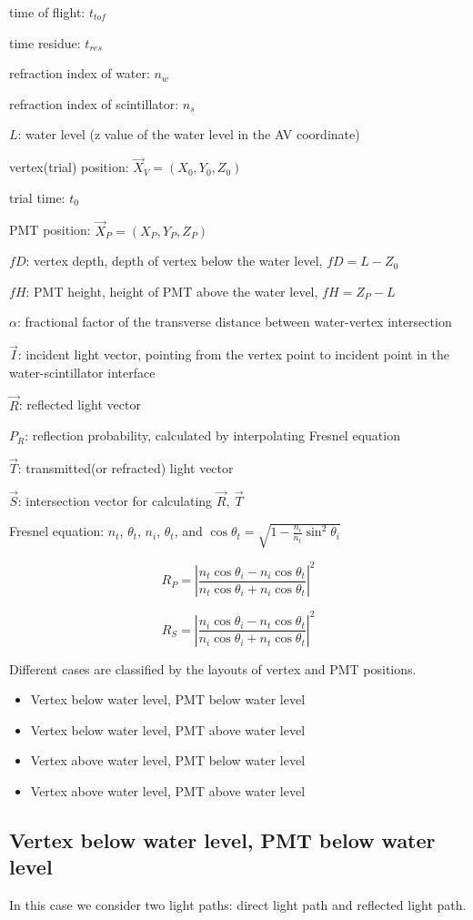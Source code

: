 \documentclass[preprint,12pt]{elsarticle}
\begin{document}
time of flight: $t_{tof}$

time residue: $t_{res}$

refraction index of water: $n_w$

refraction index of scintillator: $n_s$

$L$: water level (z value of the water level in the AV coordinate)

vertex(trial) position: $\vec{X}_{V} = (X_0, Y_0, Z_0)$

trial time: $t_0$

PMT position: $\vec{X}_{P} = (X_P, Y_P, Z_P)$

$fD$: vertex depth, depth of vertex below the water level, $fD = L - Z_0$

$fH$: PMT height, height of PMT above the water level, $fH = Z_P - L$ 

$\alpha$: fractional factor of the transverse distance between water-vertex intersection

$\vec{I}$: incident light vector, pointing from the vertex point to incident point in the water-scintillator interface   

$\vec{R}$: reflected light vector

$P_R$: reflection probability, calculated by interpolating Fresnel equation

$\vec{T}$: transmitted(or refracted) light vector

$\vec{S}$: intersection vector for calculating $\vec{R},~\vec{T}$


Fresnel equation: 
$n_t$, $\theta_t$, $n_i$, $\theta_t$, and $\cos\theta_t=\sqrt{1-\frac{n_i}{n_t}\sin^2\theta_i}$

\[
R_P = \left|\frac{n_t\cos\theta_i - n_i\cos\theta_t}{n_t\cos\theta_i+n_i\cos\theta_t}\right|^2
\]

\[
R_S = \left|\frac{n_i\cos\theta_i - n_t\cos\theta_t}{n_i\cos\theta_i+n_t\cos\theta_t}\right|^2
\]


Different cases are classified by the layouts of vertex and PMT positions. 
\begin{itemize}
\item Vertex below water level, PMT below water level
\item Vertex below water level, PMT above water level
\item Vertex above water level, PMT below water level
\item Vertex above water level, PMT above water level
\end{itemize}

\subsection{Vertex below water level, PMT below water level}
In this case we consider two light paths: direct light path and reflected light path.
\end{document}
